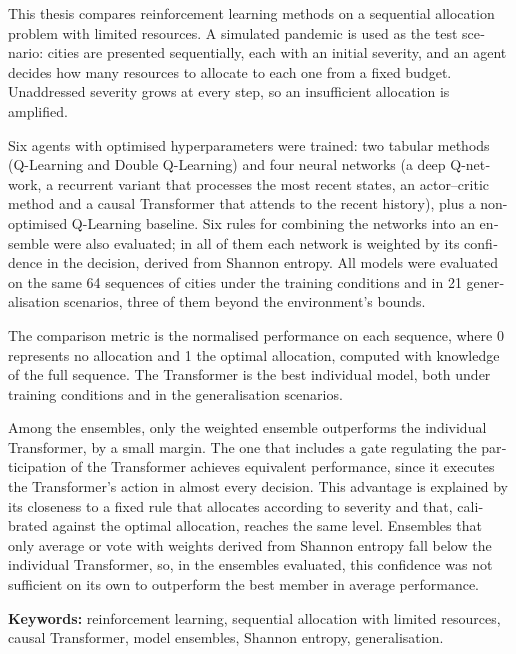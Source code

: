 \documentclass[../00_Main/Main.tex]{subfiles}
\begin{document}
\begin{otherlanguage}{english}

This thesis compares reinforcement learning methods on a sequential
allocation problem with limited resources. A simulated pandemic is used
as the test scenario: cities are presented sequentially, each with an
initial severity, and an agent decides how many resources to allocate to
each one from a fixed budget. Unaddressed severity grows at every step,
so an insufficient allocation is amplified.

Six agents with optimised hyperparameters were trained: two tabular
methods (Q-Learning and Double Q-Learning) and four neural networks (a
deep Q-network, a recurrent variant that processes the most recent
states, an actor--critic method and a causal Transformer that attends to
the recent history), plus a non-optimised Q-Learning baseline. Six rules
for combining the networks into an ensemble were also evaluated; in all
of them each network is weighted by its confidence in the decision,
derived from Shannon entropy. All
models were evaluated on the same 64 sequences of cities under the
training conditions and in 21 generalisation scenarios, three of them beyond the environment's bounds.

The comparison metric is the normalised performance on each sequence,
where 0 represents no allocation and 1 the optimal allocation, computed
with knowledge of the full sequence. The Transformer is the best individual model, both under training
conditions and in the generalisation scenarios.

Among the ensembles, only the weighted ensemble outperforms the
individual Transformer, by a small margin. The one that includes a
gate regulating the participation of the Transformer achieves
equivalent performance, since it executes the Transformer's action in
almost every decision. This advantage is explained by its closeness to a fixed rule that
allocates according to severity and that, calibrated against the optimal
allocation, reaches the same level. Ensembles that only average
or vote with weights derived from Shannon entropy fall below the
individual Transformer, so, in the ensembles evaluated, this confidence
was not sufficient on its own to outperform the best member in average performance.

\par\vspace{0.5\baselineskip}
\noindent\textbf{Keywords:} reinforcement learning, sequential
allocation with limited resources, causal Transformer, model ensembles, Shannon entropy,
generalisation.

\end{otherlanguage}

\biblio %
\end{document}
